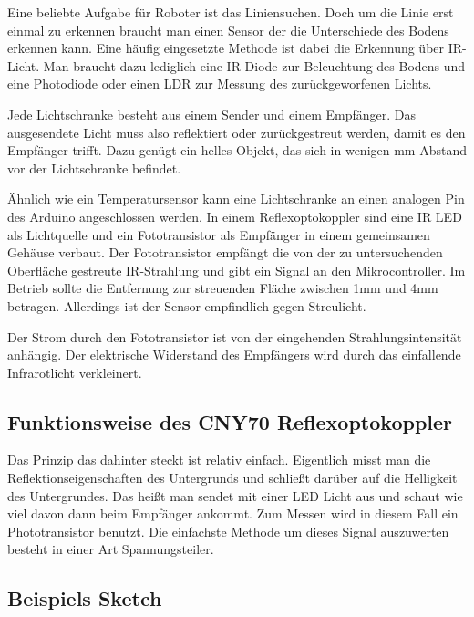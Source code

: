 Eine beliebte Aufgabe für Roboter ist das Liniensuchen. Doch um die Linie erst einmal zu erkennen braucht man einen Sensor der die Unterschiede des Bodens erkennen kann. Eine häufig eingesetzte Methode ist dabei die Erkennung über IR-Licht. Man braucht dazu lediglich eine IR-Diode zur Beleuchtung des Bodens und eine Photodiode oder einen LDR zur Messung des zurückgeworfenen Lichts.

Jede Lichtschranke besteht aus einem Sender und einem Empfänger. Das ausgesendete Licht muss also reflektiert oder zurückgestreut werden, damit es den Empfänger trifft. Dazu genügt ein helles Objekt, das sich in wenigen mm Abstand vor der Lichtschranke befindet.

Ähnlich wie ein Temperatursensor  kann  eine Lichtschranke an einen analogen Pin des Arduino angeschlossen werden. In einem Reflexoptokoppler sind eine IR LED als Lichtquelle und ein Fototransistor als Empfänger in einem gemeinsamen Gehäuse verbaut. Der Fototransistor empfängt die von der zu untersuchenden Oberfläche gestreute IR-Strahlung und gibt ein Signal an den Mikrocontroller. Im Betrieb sollte die Entfernung zur streuenden Fläche zwischen 1mm und 4mm betragen. Allerdings ist der Sensor empfindlich gegen Streulicht.

Der Strom durch den Fototransistor ist von der eingehenden Strahlungsintensität anhängig. Der elektrische Widerstand des Empfängers wird durch das einfallende Infrarotlicht verkleinert.

\subsection{Funktionsweise des CNY70 Reflexoptokoppler}

Das Prinzip das dahinter steckt ist relativ einfach. Eigentlich misst man die Reflektionseigenschaften 
des Untergrunds und schließt darüber auf die Helligkeit des Untergrundes. Das heißt man sendet mit 
einer LED Licht aus und schaut wie viel davon dann beim Empfänger ankommt. Zum Messen wird 
in diesem Fall ein Phototransistor benutzt. Die einfachste Methode um dieses Signal auszuwerten 
besteht in einer Art Spannungsteiler.



\subsection{Beispiels Sketch}

